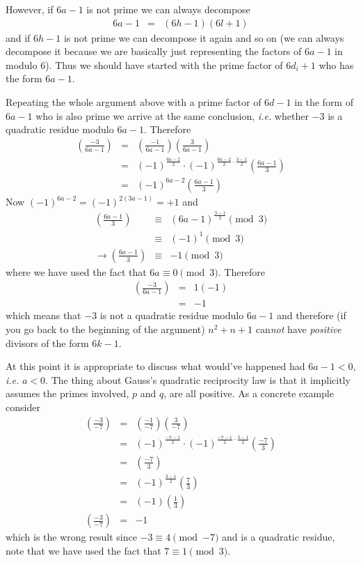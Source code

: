 \documentclass[aps,preprint,preprintnumbers,nofootinbib,showpacs,prd]{revtex4-1}
\newcommand{\ie}{{\it i.e.} }
\newcommand{\nbea}{\begin{eqnarray*}}
\newcommand{\neea}{\end{eqnarray*}}
\begin{document}
However, if $6a - 1$ is not prime we can always decompose
%
\nbea
6a - 1 & = & (6h - 1)(6l + 1)
\neea
%
and if $6h - 1$ is not prime we can decompose it again and so on (we can always decompose it because we are basically just representing the factors of $6a - 1$ in modulo 6). Thus we should have started with the prime factor of $6d_i + 1$ who has the form $6a - 1$.

Repeating the whole argument above with a prime factor of $6d - 1$ in the form of $6a - 1$ who is also prime we arrive at the same conclusion, \ie whether $-3$ is a quadratic residue modulo $6a - 1$. Therefore
%
\nbea
\left ( \frac{-3}{6a - 1} \right ) & = & \left ( \frac{-1}{6a - 1} \right ) \left ( \frac{3}{6a - 1} \right ) \\
& = & (-1)^{\frac{6a - 2}{2}} \cdot (-1)^{\frac{6a-2}{2}\cdot \frac{3-1}{2}}\left ( \frac{6a - 1}{3} \right ) \\
& = &  (-1)^{6a - 2} \left ( \frac{6a - 1}{3} \right )
\neea
%
Now $(-1)^{6a - 2} = (-1)^{2(3a - 1)} = +1$ and
%
\nbea
\left ( \frac{6a - 1}{3} \right ) & \equiv & (6a - 1)^{\frac{3-1}{2}} \pmod{3} \\
& \equiv & (-1)^1 \pmod{3} \\
\to \left ( \frac{6a - 1}{3} \right ) & \equiv & -1 \pmod{3}
\neea
%
where we have used the fact that $6a \equiv 0 \pmod{3}$. Therefore
%
\nbea
\left ( \frac{-3}{6a - 1} \right ) & = & 1 (-1) \\
& = & -1
\neea
%
which means that $-3$ is not a quadratic residue modulo $6a-1$ and therefore (if you go back to the beginning of the argument) $n^2 + n + 1$ can{\it not} have {\it positive} divisors of the form $6k - 1$.

At this point it is appropriate to discuss what would've happened had $6a-1 < 0$, \ie $a<0$. The thing about Gauss's quadratic reciprocity law is that it implicitly assumes the primes involved, $p$ and $q$, are all positive. As a concrete example consider
%
\nbea
\left ( \frac{-3}{-7} \right ) & = & \left ( \frac{-1}{-7} \right ) \left ( \frac{3}{-7} \right ) \\
& = & (-1)^{\frac{-7-1}{2}} \cdot (-1)^{\frac{-7-1}{2}\cdot \frac{3-1}{2}} \left ( \frac{-7}{3} \right )  \\
& = & \left ( \frac{-7}{3} \right ) \\
& = & (-1)^{\frac{3-1}{2}} \left ( \frac{7}{3} \right ) \\
& = & (-1) \left ( \frac{1}{3} \right ) \\
\left ( \frac{-3}{-7} \right ) & = & -1
\neea
%
which is the wrong result since $-3 \equiv 4 \pmod{-7}$ and is a quadratic residue, note that we have used the fact that $7 \equiv 1 \pmod{3}$.
\end{document}
